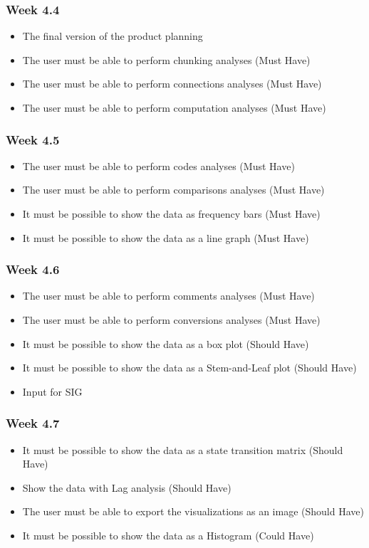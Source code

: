 \subsubsection{Week 4.4}
\begin{itemize}
	\item The final version of the product planning
	\item The user must be able to perform chunking analyses (Must Have)
	\item The user must be able to perform connections analyses (Must Have)
	\item The user must be able to perform computation analyses (Must Have)
\end{itemize}
\subsubsection{Week 4.5}
\begin{itemize}
	\item The user must be able to perform codes analyses (Must Have)
	\item The user must be able to perform comparisons analyses (Must Have)
	\item It must be possible to show the data as frequency bars (Must Have)
	\item It must be possible to show the data as a line graph (Must Have)
\end{itemize}
\subsubsection{Week 4.6}
\begin{itemize}
	\item The user must be able to perform comments analyses (Must Have)
	\item The user must be able to perform conversions analyses (Must Have)
	\item It must be possible to show the data as a box plot (Should Have)
	\item It must be possible to show the data as a Stem-and-Leaf plot (Should Have)
	\item Input for SIG
\end{itemize}
\subsubsection{Week 4.7}
\begin{itemize}
	\item It must be possible to show the data as a state transition matrix (Should Have)
	\item Show the data with Lag analysis (Should Have)
	\item The user must be able to export the visualizations as an image (Should Have)
	\item It must be possible to show the data as a Histogram (Could Have)
\end{itemize}
